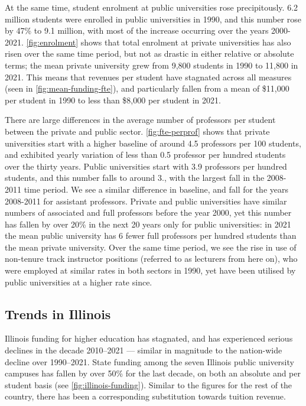 At the same time, student enrolment at public universities rose precipitously.
6.2 million students were enrolled in public universities in 1990, and this number rose by 47\% to 9.1 million, with most of the increase occurring over the years 2000-2021.
\autoref{fig:enrolment} shows that total enrolment at private universities has also risen over the same time period, but not as drastic in either relative or absolute terms; the mean private university grew from 9,800 students in 1990 to 11,800 in 2021.
This means that revenues per student have stagnated across all measures (seen in \autoref{fig:mean-funding-fte}), and particularly fallen from a mean of \$11,000 per student in 1990 to less than \$8,000 per student in 2021.

There are large differences in the average number of professors per student between the private and public sector.
\autoref{fig:fte-perprof} shows that private universities start with  a higher baseline of around 4.5 professors per 100 students, and exhibited yearly variation of less than 0.5 professor per hundred students over the thirty years.
Public universities start with 3.9 professors per hundred students, and this number falls to around 3., with the largest fall in the 2008-2011 time period.
We see a similar difference in baseline, and fall for the years 2008-2011 for assistant professors.
Private and public universities have similar numbers of associated and full professors before the year 2000, yet this number has fallen by over 20\% in the next 20 years only for public universities: in 2021 the mean public university has 6 fewer full professors per hundred students than the mean private university.
Over the same time period, we see the rise in use of non-tenure track instructor positions (referred to as lecturers from here on), who were employed at similar rates in both sectors in 1990, yet have been utilised by public universities at a higher rate since.

\subsection{Trends in Illinois}
\label{sec:trends-illinois}

Illinois funding for higher education has stagnated, and has experienced serious declines in the decade 2010--2021 --- similar in magnitude to the nation-wide decline over 1990--2021.
State funding among the seven Illinois public university campuses has fallen by over 50\% for the last decade, on both an absolute and per student basis (see \autoref{fig:illinois-funding}).
Similar to the figures for the rest of the country, there has been a corresponding substitution towards tuition revenue.

